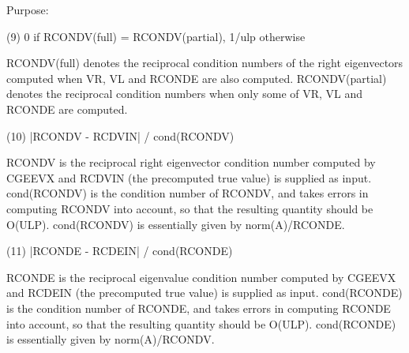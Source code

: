 \begin{DoxyParagraph}{Purpose\+: }
\begin{DoxyVerb}
    (9)     0 if RCONDV(full) = RCONDV(partial), 1/ulp otherwise

      RCONDV(full) denotes the reciprocal condition numbers of the
      right eigenvectors computed when VR, VL and RCONDE are also
      computed. RCONDV(partial) denotes the reciprocal condition
      numbers when only some of VR, VL and RCONDE are computed.

   (10)     |RCONDV - RCDVIN| / cond(RCONDV)

      RCONDV is the reciprocal right eigenvector condition number
      computed by CGEEVX and RCDVIN (the precomputed true value)
      is supplied as input. cond(RCONDV) is the condition number of
      RCONDV, and takes errors in computing RCONDV into account, so
      that the resulting quantity should be O(ULP). cond(RCONDV) is
      essentially given by norm(A)/RCONDE.

   (11)     |RCONDE - RCDEIN| / cond(RCONDE)

      RCONDE is the reciprocal eigenvalue condition number
      computed by CGEEVX and RCDEIN (the precomputed true value)
      is supplied as input.  cond(RCONDE) is the condition number
      of RCONDE, and takes errors in computing RCONDE into account,
      so that the resulting quantity should be O(ULP). cond(RCONDE)
      is essentially given by norm(A)/RCONDV.\end{DoxyVerb}
 
\end{DoxyParagraph}

